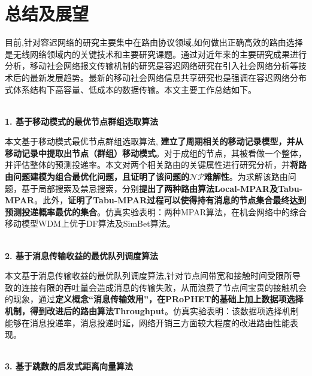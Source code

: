 
\chapter{总结及展望}

目前,针对容迟网络的研究主要集中在路由协议领域,如何做出正确高效的路由选择是无线网络领域内的关键技术和主要研究课题。通过对近年来的主要研究成果进行分析，移动社会网络报文传输机制的研究是容迟网络研究在引入社会网络分析等技术后的最新发展趋势。最新的移动社会网络信息共享研究也是强调在容迟网络分布式体系结构下高容量、低成本的数据传输。本文主要工作总结如下。

~\\
\noindent\textbf{1. 基于移动模式的最优节点群组选取算法} 

本文基于移动模式最优节点群组选取算法, \textbf{建立了周期相关的移动记录模型，并从移动记录中提取出节点（群组）移动模式}。对于成组的节点，其被看做一个整体，并评估整体的预测投递率。本文对两个相关路由的关键属性进行研究分析，并\textbf{将路由问题建模为组合最优化问题，且证明了该问题的$\mathcal{NP}$难解性}。为求解该路由问题，基于局部搜索及禁忌搜索，分别\textbf{提出了两种路由算法Local-MPAR及Tabu-MPAR}。此外，\textbf{证明了Tabu-MPAR过程可以使得持有消息的节点集合最终达到预测投递概率最优的集合}。仿真实验表明：两种MPAR算法，在机会网络中的综合移动模型WDM上优于DF算法及SimBet算法。

~\\
\noindent\textbf{2. 基于消息传输收益的最优队列调度算法}

本文基于消息传输收益的最优队列调度算法,针对节点间带宽和接触时间受限所导致的连接有限的吞吐量会造成消息的传输失败，从而浪费了节点间宝贵的接触机会的现象，通过\textbf{定义概念“消息传输效用”，在PRoPHET的基础上加上数据项选择机制，得到改进后的路由算法Throughput}。仿真实验表明：该数据项选择机制能够在消息投递率，消息投递时延，网络开销三方面较大程度的改进路由性能表现。

~\\
\noindent\textbf{3. 基于跳数的启发式距离向量算法}

